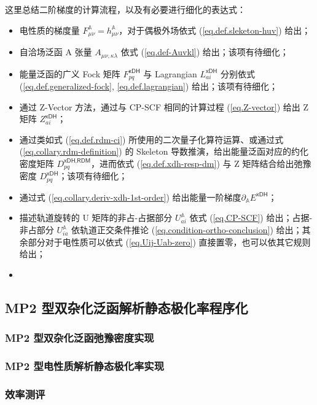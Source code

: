 这里总结二阶梯度的计算流程，以及有必要进行细化的表达式：
\begin{itemize}[nosep]
  \item 电性质的梯度量 $F_{\mu \nu}^\mathbb{A} = h_{\mu \nu}^\mathbb{A}$，对于偶极外场依式 (\ref{eq.def.sleketon-huv}) 给出；
  \item 自洽场泛函 A 张量 $A_{\mu \nu, \kappa \lambda}$ 依式 (\ref{eq.def-Auvkl}) 给出；该项有待细化；
  \item 能量泛函的广义 Fock 矩阵 $F_{pq}^\textsf{xDH}$ 与 Lagrangian $L_{ai}^\textsf{xDH}$ 分别依式 (\ref{eq.def.generalized-fock}, \ref{eq.def.lagrangian}) 给出；该项有待细化；
  \item 通过 Z-Vector 方法，通过与 CP-SCF 相同的计算过程 (\ref{eq.Z-vector}) 给出 Z 矩阵 $Z_{ai}^\textsf{xDH}$；
  \item 通过类如式 (\ref{eq.def.rdm-ci}) 所使用的二次量子化算符运算、或通过式 (\ref{eq.collary.rdm-definition}) 的 Skeleton 导数推演，给出能量泛函对应的约化密度矩阵 $D_{pq}^{\textsf{xDH}, \textsf{RDM}}$，进而依式 (\ref{eq.def.xdh-resp-dm}) 与 Z 矩阵结合给出弛豫密度 $D_{pq}^\textsf{xDH}$；该项有待细化；
  \item 通过式 (\ref{eq.collary.deriv-xdh-1st-order}) 给出能量一阶梯度$\partial_\mathbb{A} E^\textsf{xDH}$；
  \item 描述轨道旋转的 U 矩阵的非占-占据部分 $U_{ai}^\mathbb{A}$ 依式 (\ref{eq.CP-SCF}) 给出；占据-非占部分 $U_{ia}^\mathbb{A}$ 依轨道正交条件推论 (\ref{eq.condition-ortho-conclusion}) 给出；其余部分对于电性质可以依式 (\ref{eq.Uij-Uab-zero}) 直接置零，也可以依其它规则给出；
  \item 
\end{itemize}

\subsection{MP2 型双杂化泛函解析静态极化率程序化}
\label{sec.3.program}

\subsubsection{MP2 型双杂化泛函弛豫密度实现}

\subsubsection{MP2 型电性质解析静态极化率实现}

\subsubsection{效率测评}

